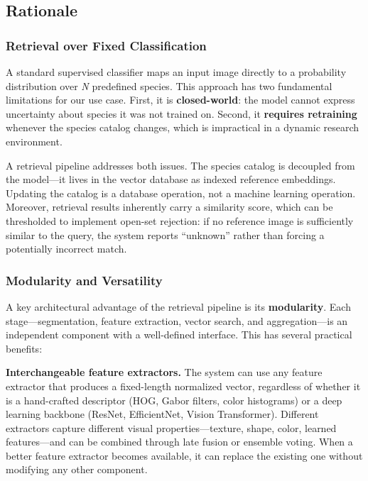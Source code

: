 \subsection{Rationale}\label{rationale}

\subsubsection{Retrieval over Fixed Classification}\label{retrieval-over-fixed-classification}

A standard supervised classifier maps an input image directly to a probability distribution over \emph{N} predefined species. This approach has two fundamental limitations for our use case. First, it is \textbf{closed-world}: the model cannot express uncertainty about species it was not trained on. Second, it \textbf{requires retraining} whenever the species catalog changes, which is impractical in a dynamic research environment.

A retrieval pipeline addresses both issues. The species catalog is decoupled from the model---it lives in the vector database as indexed reference embeddings. Updating the catalog is a database operation, not a machine learning operation. Moreover, retrieval results inherently carry a similarity score, which can be thresholded to implement open-set rejection: if no reference image is sufficiently similar to the query, the system reports ``unknown'' rather than forcing a potentially incorrect match.

\subsubsection{Modularity and Versatility}\label{modularity-and-versatility}

A key architectural advantage of the retrieval pipeline is its \textbf{modularity}. Each stage---segmentation, feature extraction, vector search, and aggregation---is an independent component with a well-defined interface. This has several practical benefits:

\textbf{Interchangeable feature extractors.} The system can use any feature extractor that produces a fixed-length normalized vector, regardless of whether it is a hand-crafted descriptor (HOG, Gabor filters, color histograms) or a deep learning backbone (ResNet, EfficientNet, Vision Transformer). Different extractors capture different visual properties---texture, shape, color, learned features---and can be combined through late fusion or ensemble voting. When a better feature extractor becomes available, it can replace the existing one without modifying any other component.

